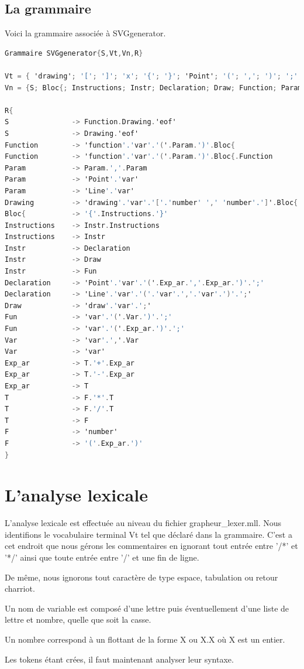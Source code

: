 \documentclass[11pt]{report} %
\begin{document}
\subsection{La grammaire}
Voici la grammaire associée à SVGgenerator.
\begin{lstlisting}[caption=Grammaire associée a SVGgenerator, language=C]
Grammaire SVGgenerator{S,Vt,Vn,R}

Vt = { 'drawing'; '['; ']'; 'x'; '{'; '}'; 'Point'; '('; ','; ')'; ';'; 'Line'; 'draw'; 'var'; 'number'; 'eof'; '+'; '-'; '/'; '*'}
Vn = {S; Bloc{; Instructions; Instr; Declaration; Draw; Function; Param; Exp_ar; Var; T; F}

R{
S				-> Function.Drawing.'eof'
S				-> Drawing.'eof'
Function		-> 'function'.'var'.'('.Param.')'.Bloc{
Function		-> 'function'.'var'.'('.Param.')'.Bloc{.Function
Param			-> Param.','.Param
Param			-> 'Point'.'var'
Param			-> 'Line'.'var'
Drawing			-> 'drawing'.'var'.'['.'number' ',' 'number'.']'.Bloc{
Bloc{			-> '{'.Instructions.'}'
Instructions	-> Instr.Instructions
Instructions	-> Instr
Instr			-> Declaration
Instr			-> Draw
Instr			-> Fun
Declaration		-> 'Point'.'var'.'('.Exp_ar.','.Exp_ar.')'.';'
Declaration		-> 'Line'.'var'.'('.'var'.','.'var'.')'.';'
Draw			-> 'draw'.'var'.';'
Fun 			-> 'var'.'('.Var.')'.';'
Fun 			-> 'var'.'('.Exp_ar.')'.';'
Var				-> 'var'.','.Var
Var				-> 'var'
Exp_ar 			-> T.'+'.Exp_ar
Exp_ar 			-> T.'-'.Exp_ar
Exp_ar			-> T
T				-> F.'*'.T
T				-> F.'/'.T
T				-> F
F				-> 'number'
F				-> '('.Exp_ar.')'
}
\end{lstlisting}

\section{L'analyse lexicale}
	L'analyse lexicale est effectuée au niveau du fichier grapheur\_lexer.mll. Nous identifions le vocabulaire terminal Vt tel que déclaré dans la grammaire. C'est a cet endroit que nous gérons les commentaires en ignorant tout entrée entre '/*' et '*/' ainsi que toute entrée entre '/' et une fin de ligne.

De même, nous ignorons tout caractère de type espace, tabulation ou retour charriot.

Un nom de variable est composé d'une lettre puis éventuellement d'une liste de lettre et nombre, quelle que soit la casse.

Un nombre correspond à un flottant de la forme X ou X.X où X est un entier.

Les tokens étant crées, il faut maintenant analyser leur syntaxe.
\end{document}
